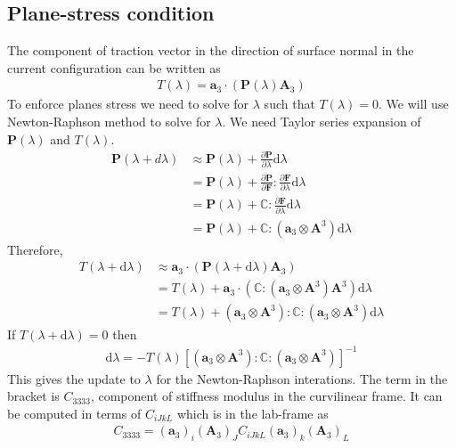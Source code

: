 \documentclass[../main.tex]{subfiles}
\begin{document}
\subsection{Plane-stress condition}
The component of traction vector in the direction of surface normal in
the current configuration can be written as
\begin{align*}
  T(\lambda) = \mathbf{a}_3\cdot\left(\mathbf{P}(\lambda)\mathbf{A}_3\right)
\end{align*}
To enforce planes stress we need to solve for $\lambda$ such that
$T(\lambda) = 0$. We will use Newton-Raphson method to solve for
$\lambda$. We need Taylor series expansion of $\mathbf{P}(\lambda)$
and $T(\lambda)$.
\begin{align*}
  \mathbf{P}(\lambda+d\lambda) &\approx \mathbf{P}(\lambda) + \frac{\partial \mathbf{P}}{\partial \lambda}\mathrm{d}\lambda\\
                               &= \mathbf{P}(\lambda) + \frac{\partial\mathbf{P}}{\partial\mathbf{F}}:\frac{\partial\mathbf{F}}{\partial\lambda}\mathrm{d}\lambda\\
                               & = \mathbf{P}(\lambda) + \mathbb{C}:\frac{\partial\mathbf{F}}{\partial\lambda}\mathrm{d}\lambda\\
                               &=\mathbf{P}(\lambda) + \mathbb{C}:(\mathbf{a}_3\otimes\mathbf{A}^3)\mathrm{d}\lambda
\end{align*}
Therefore,
\begin{align*}
  T(\lambda+\mathrm{d}\lambda) &\approx \mathbf{a}_3\cdot\left(\mathbf{P}(\lambda+\mathrm{d}\lambda)\mathbf{A}_3\right)\\
                               &= T(\lambda) + \mathbf{a}_3\cdot\left(\mathbb{C}:(\mathbf{a}_3\otimes\mathbf{A}^3)\mathbf{A}^3\right)\mathrm{d}\lambda\\
                               & = T(\lambda) + (\mathbf{a}_3\otimes\mathbf{A}^3):\mathbb{C}:(\mathbf{a}_3\otimes\mathbf{A}^3)\mathrm{d}\lambda
\end{align*}
If $T(\lambda+\mathrm{d}\lambda) = 0$ then
\begin{align*}
  \mathrm{d}\lambda = - T(\lambda)\left[(\mathbf{a}_3\otimes\mathbf{A}^3):\mathbb{C}:(\mathbf{a}_3\otimes\mathbf{A}^3)\right]^{-1}
\end{align*}
This gives the update to $\lambda$ for the Newton-Raphson
interations. The term in the bracket is $C_{3333}$, component of
stiffness modulus in the curvilinear frame. It can be computed in
terms of $C_{iJkL}$ which is in the lab-frame as
\begin{align*}
  C_{3333} = (\mathbf{a}_3)_i(\mathbf{A}_3)_JC_{iJkL}(\mathbf{a}_3)_k(\mathbf{A}_3)_L
\end{align*}
\end{document}
